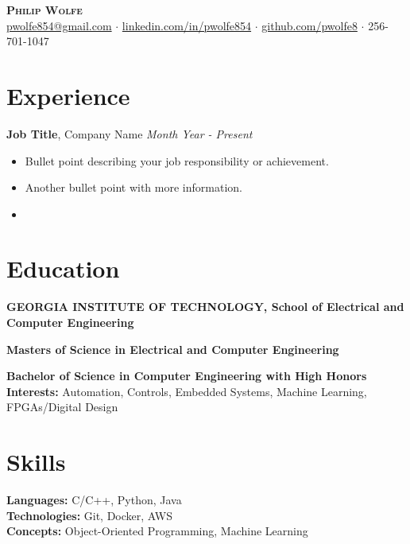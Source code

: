 \documentclass[11pt, a4paper]{article}
\newcommand{\header}[7]{
  \begin{center}
    {\LARGE \bfseries\scshape #1}\\
    \vspace{2mm}
    \href{mailto:#2}{#2} $\cdot$ \href{#3}{#6} $\cdot$ \href{#4}{#7} $\cdot$ #5\\
    \vspace{0mm}
  \end{center}
}
\begin{document}
\header{Philip Wolfe}{pwolfe854@gmail.com}{https://www.linkedin.com/in/pwolfe854}{https://github.com/pwolfe8}{256-701-1047}{linkedin.com/in/pwolfe854}{github.com/pwolfe8}



\section*{Experience}
\textbf{Job Title}, Company Name \textit{Month Year - Present}\\
\begin{itemize}
  \item Bullet point describing your job responsibility or achievement.
  \item Another bullet point with more information.
  \item \fpgaLong
  
\end{itemize}



\section*{Education}
{\small
\textbf{GEORGIA INSTITUTE OF TECHNOLOGY, School of Electrical and Computer Engineering}\par
\textbf{Masters of Science in Electrical and Computer Engineering}\par
\textbf{Bachelor of Science in Computer Engineering with High Honors}\\
\textbf{Interests:} Automation, Controls, Embedded Systems, Machine Learning, FPGAs/Digital Design
}

\section*{Skills}
\textbf{Languages:} C/C++, Python, Java\\
\textbf{Technologies:} Git, Docker, AWS\\
\textbf{Concepts:} Object-Oriented Programming, Machine Learning
\end{document}
